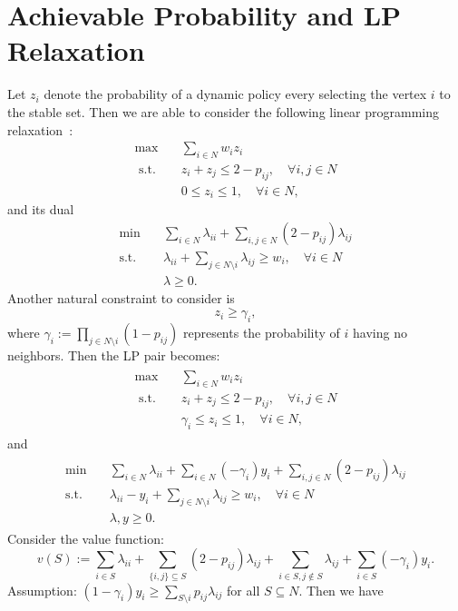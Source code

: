 \documentclass[10pt,leqno]{amsart}
\begin{document}
\section{Achievable Probability and LP Relaxation}
Let $z_i$ denote the probability of a dynamic policy every selecting the vertex $i$ to the stable set. Then we are able to consider the following linear programming relaxation~\cite{DNP}:
\begin{align*}
  \max\quad &\sum_{i\in N}w_iz_i\\
  \text{ s.t.}\quad&z_i+z_j\leq 2-p_{ij},\quad\forall i,j\in N\\
  &0\leq z_i\leq 1,\quad \forall i\in N,
\end{align*}
and its dual
\begin{align*}
  \min\quad &\sum_{i\in N}\lambda_{ii}+\sum_{i,j\in N}(2-p_{ij})\lambda_{ij}\\
  \text{s.t.}\quad &\lambda_{ii}+\sum_{j\in N\setminus i}\lambda_{ij}\geq w_i,\quad \forall i\in N\\
  &\lambda\geq 0.
\end{align*}
Another natural constraint to consider is
\[z_i\geq\gamma_i,\]
where $\gamma_i:=\prod_{j\in N\setminus i}(1-p_{ij})$ represents the probability of $i$ having no neighbors.
Then the LP pair becomes:
\begin{align}
  \begin{split}
    \max\quad &\sum_{i\in N}w_iz_i\\
    \text{ s.t.}\quad&z_i+z_j\leq 2-p_{ij},\quad\forall i,j\in N\\
    &\gamma_i\leq z_i\leq 1,\quad \forall i\in N,
  \end{split}
\end{align}
and
\begin{align}
  \begin{split}
    \min\quad &\sum_{i\in N}\lambda_{ii}+\sum_{i\in N}(-\gamma_i)y_i+\sum_{i,j\in N}(2-p_{ij})\lambda_{ij}\\
    \text{s.t.}\quad &\lambda_{ii}-y_i+\sum_{j\in N\setminus i}\lambda_{ij}\geq w_i,\quad \forall i\in N\\
    &\lambda,y\geq 0.
  \end{split}
\end{align}
Consider the value function:
\[v(S):=\sum_{i\in S}\lambda_{ii}+\sum_{\{i,j\}\subseteq S}(2-p_{ij})\lambda_{ij}+\sum_{i\in S,j\notin S}\lambda_{ij}+\sum_{i\in S}(-\gamma_i)y_i.\]
Assumption: $(1-\gamma_i)y_i\geq \sum_{S\setminus i}p_{ij}\lambda_{ij}$ for all $S\subseteq N$. Then we have
\end{document}
